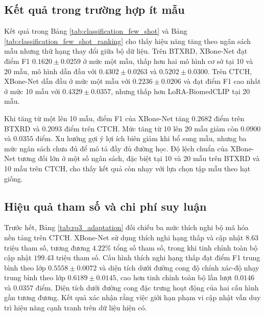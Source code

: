 \subsection{Kết quả trong trường hợp ít mẫu}
Kết quả trong Bảng \ref{tab:classification_few_shot} và Bảng \ref{tab:classification_few_shot_ranking} cho thấy hiệu năng tăng theo ngân sách mẫu nhưng thứ hạng thay đổi giữa bộ dữ liệu. Trên BTXRD, XBone-Net đạt điểm F1 $0{.}1620\pm0{.}0259$ ở mức một mẫu, thấp hơn hai mô hình cơ sở tại 10 và 20 mẫu, mô hình dẫn đầu với $0{.}4302\pm0{.}0263$ và $0{.}5202\pm0{.}0300$. Trên CTCH, XBone-Net dẫn đầu ở mức một mẫu với $0{.}2236\pm0{.}0206$ và đạt điểm F1 cao nhất ở mức 10 mẫu với $0{.}4329\pm0{.}0357$, nhưng thấp hơn LoRA-BiomedCLIP tại 20 mẫu.





Khi tăng từ một lên 10 mẫu, điểm F1 của XBone-Net tăng $0{.}2682$ điểm trên BTXRD và $0{.}2093$ điểm trên CTCH. Mức tăng từ 10 lên 20 mẫu giảm còn $0{.}0900$ và $0{.}0355$ điểm. Xu hướng gợi ý lợi ích biên giảm khi bổ sung mẫu, nhưng ba mức ngân sách chưa đủ để mô tả đầy đủ đường học. Độ lệch chuẩn của XBone-Net tương đối lớn ở một số ngân sách, đặc biệt tại 10 và 20 mẫu trên BTXRD và 10 mẫu trên CTCH, cho thấy kết quả còn nhạy với lựa chọn tập mẫu theo hạt giống.

\subsection{Hiệu quả tham số và chi phí suy luận}
\label{subsec:rq3_adaptation_results}

Trước hết, Bảng \ref{tab:rq3_adaptation} đối chiếu ba mức thích nghi bộ mã hóa nền tảng trên CTCH. XBone-Net sử dụng thích nghi hạng thấp và cập nhật $8{.}63$ triệu tham số, tương đương $4{.}22\%$ tổng số tham số, trong khi tinh chỉnh toàn bộ cập nhật $199{.}43$ triệu tham số. Cấu hình thích nghi hạng thấp đạt điểm F1 trung bình theo lớp $0{.}5558\pm0{.}0072$ và diện tích dưới đường cong độ chính xác-độ nhạy trung bình theo lớp $0{.}6189\pm0{.}0145$, cao hơn tinh chỉnh toàn bộ lần lượt $0{.}0146$ và $0{.}0357$ điểm. Diện tích dưới đường cong đặc trưng hoạt động của hai cấu hình gần tương đương. Kết quả xác nhận rằng việc giới hạn phạm vi cập nhật vẫn duy trì hiệu năng cạnh tranh trên dữ liệu hiện có.



